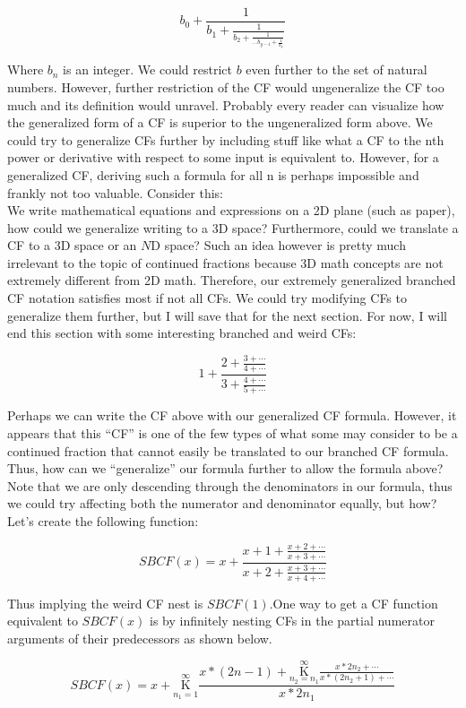 \documentclass{article}
\begin{document}
$$b_{0} + \frac{1}{b_1 + \frac{1}{b_{2} + \frac{1}{... b_{y-1} + \frac{1}{b_y}}}}$$

Where $b_n$ is an integer. We could restrict $b$ even further to the set of natural numbers. However, further restriction of the CF would ungeneralize the CF too much and its definition would unravel. Probably every reader can visualize how the generalized form of a CF is superior to the ungeneralized form above. We could try to generalize CFs further by including stuff like what a CF to the nth power or derivative with respect to some input is equivalent to. However, for a generalized CF, deriving such a formula for all n is perhaps impossible and frankly not too valuable. Consider this:
$${}$$
We write mathematical equations and expressions on a 2D plane (such as paper), how could we generalize writing to a 3D space? Furthermore, could we translate a CF to a 3D space or an $N$D space? Such an idea however is pretty much irrelevant to the topic of continued fractions because 3D math concepts are not extremely different from 2D math. Therefore, our extremely generalized branched CF notation satisfies most if not all CFs. We could try modifying CFs to generalize them further, but I will save that for the next section. For now, I will end this section with some interesting branched and weird CFs:

$$1+\frac{2+\frac{3+\cdots}{4+\cdots}}{3+\frac{4+\cdots}{5+\cdots}}$$

Perhaps we can write the CF above with our generalized CF formula. However, it appears that this “CF” is one of the few types of what some may consider to be a continued fraction that cannot easily be translated to our branched CF formula. Thus, how can we “generalize” our formula further to allow the formula above? Note that we are only descending through the denominators in our formula, thus we could try affecting both the numerator and denominator equally, but how? Let’s create the following function:

$$SBCF(x)=x+\frac{x+1+\frac{x+2+\cdots}{x+3+\cdots}}{x+2+\frac{x+3+\cdots}{x+4+\cdots}}$$

Thus implying the weird CF nest is $SBCF(1)$.One way to get a CF function equivalent to $SBCF(x)$ is by infinitely nesting CFs in the partial numerator arguments of their predecessors as shown below.

$$SBCF(x)=x+\underset{n_1=1}{\overset{\infty}{ \mathrm K}} \frac{x*(2n-1)+\underset{n_2=n_1}{\overset{\infty}{ \mathrm K}} \frac{x*2n_2+\cdots}{x*(2n_2+1)+\cdots}}{x*2n_1}$$
\end{document}
